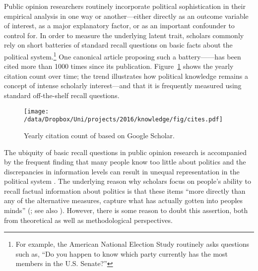 
Public opinion researchers routinely incorporate political sophistication in their empirical analysis in one way or another---either directly as an outcome variable of interest, as a major explanatory factor, or as an important confounder to control for. In order to measure the underlying latent trait, scholars commonly rely on short batteries of standard recall questions on basic facts about the political system.\footnote{For example, the American National Election Study routinely asks questions such as, ``Do you happen to know which party currently has the most members in the U.S. Senate?''} One canonical article proposing such a battery---\citet{carpini1993measuring}---has been cited more than 1000 times since its publication. Figure~\ref{fig:carpini} shows the yearly citation count over time; the trend illustrates how political knowledge remains a concept of intense scholarly interest---and that it is frequently measured using standard off-the-shelf recall questions.

\begin{figure}[h]\centering
	\texttt{[image: /data/Dropbox/Uni/projects/2016/knowledge/fig/cites.pdf]}
	\caption[Yearly citation count of \citet{carpini1993measuring}]{Yearly citation count of \citet{carpini1993measuring} based on Google Scholar.}\label{fig:carpini}
\end{figure}

The ubiquity of basic recall questions in public opinion research is accompanied by the frequent finding that many people know too little about politics \citep{carpini1996americans,barabas2014question} and the discrepancies in information levels can result in unequal representation in the political system \citep{althaus1998information,kuklinski2000misinformation,gilens2001political}. The underlying reason why scholars focus on people's ability to recall factual information about politics is that these items ``more directly than any of the alternative measures, capture what has actually gotten into peoples minds'' (\citealt[21]{zaller1992nature}; see also \citealt{zaller1991information,gomez2001political}). However, there is some reason to doubt this assertion, both from theoretical as well as methodological perspectives.

